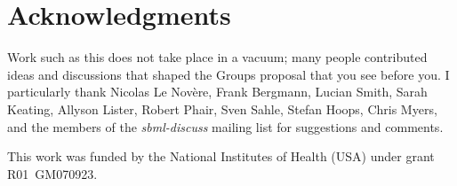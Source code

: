 
\section{Acknowledgments}

Work such as this does not take place in a vacuum; many people contributed ideas and discussions that shaped the Groups proposal that you see before you.  I particularly thank Nicolas Le Nov\`{e}re, Frank Bergmann, Lucian Smith, Sarah Keating, Allyson Lister, Robert Phair, Sven Sahle, Stefan Hoops, Chris Myers, and the members of the \emph{sbml-discuss} mailing list for suggestions and comments.

This work was funded by the National Institutes of Health (USA) under grant R01~GM070923.


